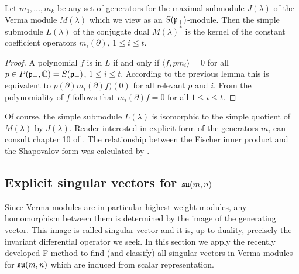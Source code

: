 \begin{theorem}
 Let $m_1,\ldots,m_k$ be any set of generators for the maximal submodule $J(\lambda)$ of the Verma module $M(\lambda)$ which we view as an $S(\mathfrak{p}_+)$-module. Then the simple submodule $L(\lambda)$ of the conjugate dual $M(\lambda)^*$ is the kernel of the constant coefficient operators $m_i(\partial)$, $1\leq i\leq t.$
\end{theorem}
\begin{proof}
 A polynomial $f$ is in $L$ if and only if $\langle f, p m_i \rangle = 0$ for all $p\in P(\mathfrak{p}_-,\mathbb{C}) = S(\mathfrak{p}_+)$, $1\leq i\leq t$. According to the previous lemma this is equivalent to $p(\partial)  m_i(\partial)f)(0)$ for all relevant $p$ and $i$. From the polynomiality of $f$ follows that $m_i(\partial)f = 0$ for all $1\leq i\leq t.$
\end{proof}

Of course, the simple submodule $L(\lambda)$ is isomorphic to the simple quotient of $M(\lambda)$ by $J(\lambda)$. Reader interested in explicit form of the generators $m_i$ can consult chapter 10 of \cite{davidson_differential_1991}. The relationship between the Fischer inner product and the Shapovalov form was calculated by \cite{wachi_contravariant_1999}.

\subsection[Explicit singular vectors for su(m, n)]{Explicit singular vectors for $\mathfrak{su}(m, n)$}\label{sec:invariant}

Since Verma modules are in particular highest weight modules, any homomorphism between them is determined by the image of the generating vector. This image is called singular vector and it is, up to duality, precisely the invariant differential operator we seek. In this section we apply the recently developed F-method \cite{kobayashi_f-method_2014, kobayashi_branching_2015} to find (and classify) all singular vectors in Verma modules for $\mathfrak{su}(m, n)$ which are induced from scalar representation.

\medskip

